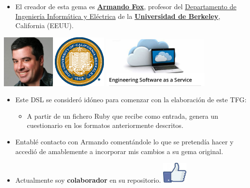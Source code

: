 \documentclass{beamer}
\begin{document}
\begin{frame}[allowframebreaks]
      \begin{itemize}
        \item El creador de esta gema es \href{http://www.armandofox.com/geek}{{\bfseries Armando Fox}}, profesor del 
        \href{http://www.cs.berkeley.edu/}{Departamento de Ingeniería Informática y Eléctrica} de la 
        \href{http://www.berkeley.edu/}{{\bfseries Universidad de Berkeley}}, California (EEUU).
      \end{itemize}
  \begin{center}
    \includegraphics[width=0.2\textwidth]{img/armando.eps}
    \hspace*{0.5cm}
    \includegraphics[width=0.2\textwidth]{img/Berkeley.eps}
    \hspace*{0.5cm}
    \includegraphics[width=0.4\textwidth]{img/sassmoc.eps}
  \end{center}
  \framebreak
  
  \begin{itemize}
    \item Este DSL se consideró idóneo para comenzar con la elaboración de este TFG:
    \begin{itemize}
      \item A partir de un fichero Ruby que recibe como entrada, genera un cuestionario en los formatos anteriormente descritos.
    \end{itemize}
    \item Entablé contacto con Armando comentándole lo que se pretendía hacer y
    accedió de amablemente a incorporar mis cambios a su gema original. 
    \item Actualmente soy {\bfseries colaborador} en su repositorio. \includegraphics[width=0.1\textwidth]{img/like.eps}
  \end{itemize}
\end{frame}
  
\end{document}
